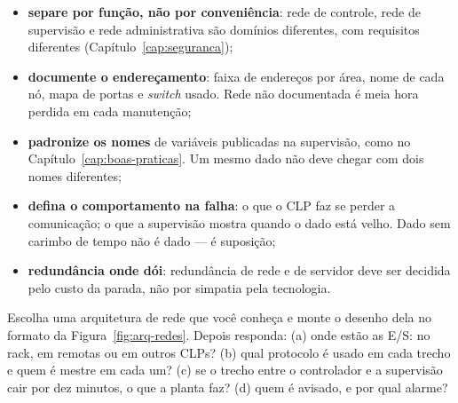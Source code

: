\begin{itemize}
  \item \textbf{separe por função, não por conveniência}: rede de controle, rede de supervisão e rede
        administrativa são domínios diferentes, com requisitos diferentes
        (Capítulo~\ref{cap:seguranca});
  \item \textbf{documente o endereçamento}: faixa de endereços por área, nome de cada nó, mapa de
        portas e \emph{switch} usado. Rede não documentada é meia hora perdida em cada manutenção;
  \item \textbf{padronize os nomes} de variáveis publicadas na supervisão, como no
        Capítulo~\ref{cap:boas-praticas}. Um mesmo dado não deve chegar com dois nomes diferentes;
  \item \textbf{defina o comportamento na falha}: o que o CLP faz se perder a comunicação; o que a
        supervisão mostra quando o dado está velho. Dado sem carimbo de tempo não é dado --- é
        suposição;
  \item \textbf{redundância onde dói}: redundância de rede e de servidor deve ser decidida pelo custo
        da parada, não por simpatia pela tecnologia.
\end{itemize}

\begin{pratica}
Escolha uma arquitetura de rede que você conheça e monte o desenho dela no formato da
Figura~\ref{fig:arq-redes}. Depois responda:
(a) onde estão as E/S: no rack, em remotas ou em outros CLPs?
(b) qual protocolo é usado em cada trecho e quem é mestre em cada um?
(c) se o trecho entre o controlador e a supervisão cair por dez minutos, o que a planta faz?
(d) quem é avisado, e por qual alarme?
\end{pratica}

